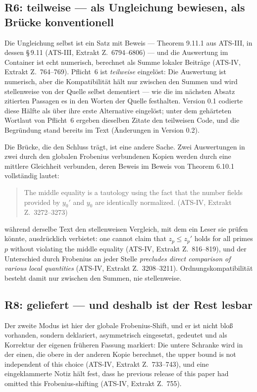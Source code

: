 \documentclass[11pt,a4paper]{article}
\theoremstyle{definition}
\newcommand{\anchor}[2]{(#1, Extrakt Z.~#2)}
\begin{document}
\subsection{R6: teilweise --- als Ungleichung bewiesen, als Brücke konventionell}

Die Ungleichung selbst ist ein Satz mit Beweis --- Theorem 9.11.1 aus ATS-III, in
dessen \S\,9.11 \anchor{ATS-III}{6794--6806} --- und
die Auswertung im Container ist echt numerisch, berechnet als Summe lokaler
Beiträge \anchor{ATS-IV}{764--769}. Pflicht~6 ist \emph{teilweise} eingelöst: Die
Auswertung ist numerisch, aber die Kompatibilität hält nur zwischen den Summen und
wird stellenweise von der Quelle selbst dementiert --- wie die im nächsten Absatz
zitierten Passagen es in den Worten der Quelle festhalten. Version 0.1 codierte
diese Hälfte als \glqq über ihre erste Alternative\grqq{} eingelöst; unter dem gehärteten
Wortlaut von Pflicht~6 ergeben dieselben Zitate den teilweisen Code, und die
Begründung stand bereits im Text (\glqq Änderungen in Version 0.2\grqq).

Die Brücke, die den Schluss trägt, ist eine andere Sache. Zwei Auswertungen in
zwei durch den globalen Frobenius verbundenen Kopien werden durch eine mittlere
Gleichheit verbunden, deren Beweis im Beweis von Theorem 6.10.1 vollständig
lautet:

\begin{quote}\small
\glqq The middle equality is a tautology using the fact that the number fields
provided by $y_0'$ and $y_0$ are identically normalized.\grqq
\hfill\anchor{ATS-IV}{3272--3273}
\end{quote}

während derselbe Text den stellenweisen Vergleich, mit dem ein Leser sie prüfen
könnte, ausdrücklich verbietet: \glqq one cannot claim that $z_p \le z_p'$ holds for
all primes $p$ without violating the middle equality\grqq
\anchor{ATS-IV}{816--819}, und der Unterschied durch Frobenius an jeder Stelle
\glqq \emph{precludes direct comparison of various local quantities}\grqq
\anchor{ATS-IV}{3208--3211}. Ordnungskompatibilität besteht damit nur zwischen den
Summen, nie stellenweise.

\subsection{R8: geliefert --- und deshalb ist der Rest lesbar}

Der zweite Modus ist hier der globale Frobenius-Shift, und er ist nicht bloß
vorhanden, sondern deklariert, asymmetrisch eingesetzt, gedeutet und als Korrektur
der eigenen früheren Fassung markiert: Die untere Schranke wird in der einen, die
obere in der anderen Kopie berechnet, \glqq the upper bound is not independent of this
choice\grqq{} \anchor{ATS-IV}{733--743}, und eine eingeklammerte Notiz hält fest, dass
\glqq [t]he previous release of this paper had omitted this Frobenius-shifting\grqq
\anchor{ATS-IV}{755}.
\end{document}
